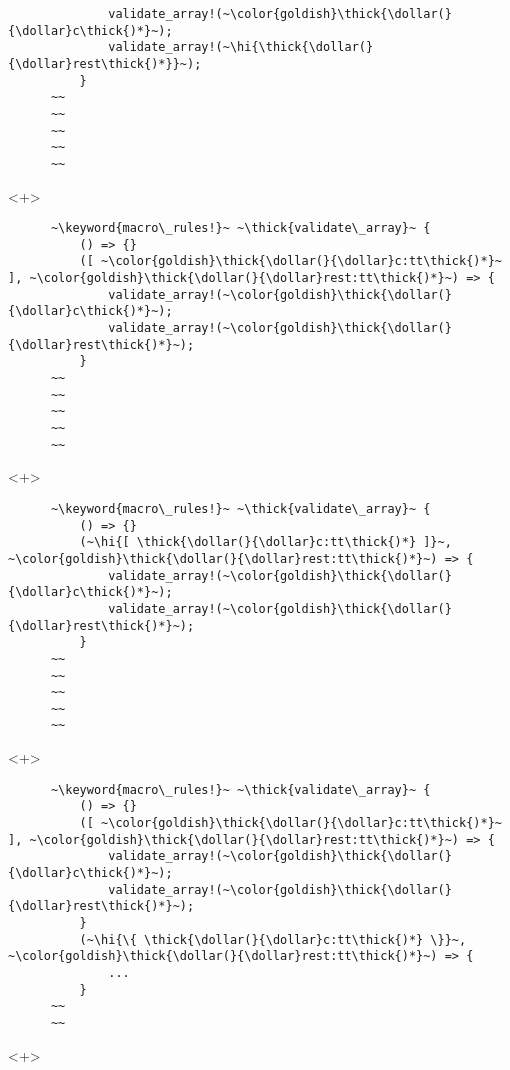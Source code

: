 \documentclass[usepdftitle=false,aspectratio=169]{beamer}
\newcommand{\dollar}{\makebox[\widthof{\$}][c]{\$}}
\newcommand{\thick}[1]{\contourlength{0.16pt}\contour[10]{black}{#1}}
\newcommand{\hi}[1]{%
\tikz[baseline=(A.base)]
 \node[highlighting=yellowbg,inner sep=0pt,text depth=0pt] (A) {#1};%
}
\newcommand{\keyword}[1]{\color{greenish}#1}
\begin{document}
\begin{frame}[fragile]
\begin{onlyenv}
\begin{verbatim}
              validate_array!(~\color{goldish}\thick{\dollar(}{\dollar}c\thick{)*}~);
              validate_array!(~\hi{\thick{\dollar(}{\dollar}rest\thick{)*}}~);
          }
      ~~
      ~~
      ~~
      ~~
      ~~
    \end{verbatim}
  \end{onlyenv}
  \begin{onlyenv}<+>
    \begin{verbatim}
      ~\keyword{macro\_rules!}~ ~\thick{validate\_array}~ {
          () => {}
          ([ ~\color{goldish}\thick{\dollar(}{\dollar}c:tt\thick{)*}~ ], ~\color{goldish}\thick{\dollar(}{\dollar}rest:tt\thick{)*}~) => {
              validate_array!(~\color{goldish}\thick{\dollar(}{\dollar}c\thick{)*}~);
              validate_array!(~\color{goldish}\thick{\dollar(}{\dollar}rest\thick{)*}~);
          }
      ~~
      ~~
      ~~
      ~~
      ~~
    \end{verbatim}
  \end{onlyenv}
  \begin{onlyenv}<+>
    \begin{verbatim}
      ~\keyword{macro\_rules!}~ ~\thick{validate\_array}~ {
          () => {}
          (~\hi{[ \thick{\dollar(}{\dollar}c:tt\thick{)*} ]}~, ~\color{goldish}\thick{\dollar(}{\dollar}rest:tt\thick{)*}~) => {
              validate_array!(~\color{goldish}\thick{\dollar(}{\dollar}c\thick{)*}~);
              validate_array!(~\color{goldish}\thick{\dollar(}{\dollar}rest\thick{)*}~);
          }
      ~~
      ~~
      ~~
      ~~
      ~~
    \end{verbatim}
  \end{onlyenv}
  \begin{onlyenv}<+>
    \begin{verbatim}
      ~\keyword{macro\_rules!}~ ~\thick{validate\_array}~ {
          () => {}
          ([ ~\color{goldish}\thick{\dollar(}{\dollar}c:tt\thick{)*}~ ], ~\color{goldish}\thick{\dollar(}{\dollar}rest:tt\thick{)*}~) => {
              validate_array!(~\color{goldish}\thick{\dollar(}{\dollar}c\thick{)*}~);
              validate_array!(~\color{goldish}\thick{\dollar(}{\dollar}rest\thick{)*}~);
          }
          (~\hi{\{ \thick{\dollar(}{\dollar}c:tt\thick{)*} \}}~, ~\color{goldish}\thick{\dollar(}{\dollar}rest:tt\thick{)*}~) => {
              ...
          }
      ~~
      ~~
    \end{verbatim}
  \end{onlyenv}
  \begin{onlyenv}<+>
    \begin{verbatim}

\end{verbatim}
\end{onlyenv}
\end{frame}
\end{document}
